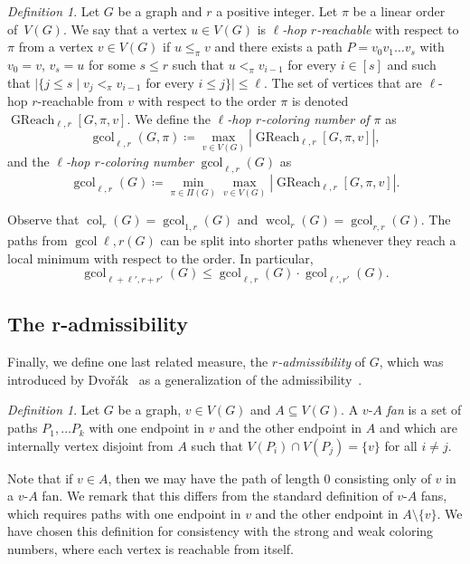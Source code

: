 \documentclass[1p,number,a4paper]{elsarticle}
\theoremstyle{remark}
\DeclareMathOperator{\col}{col}
\DeclareMathOperator{\wcol}{wcol}
\DeclareMathOperator{\gcol}{gcol}
\DeclareMathOperator{\GReach}{GReach}
\newtheorem{definition}[theorem]{Definition}
\begin{document}
\begin{definition}
    Let $G$ be a graph and $r$ a positive integer. Let $\pi$ be a 
    linear order of~$V(G)$. We say that a
    vertex $u\in V(G)$ is \emph{$\ell$-hop $r$-reachable} with respect
    to $\pi$ from a vertex
    $v\in V(G)$ if $u\leq_\pi v$ and there exists a path $P=v_0v_1\ldots v_s$ with $v_0=v$, $v_s=u$ for some $s\leq r$ such that $u<_\pi v_{i-1}$ for every $i\in [s]$ and such that $|\{j\leq s \mid v_j<_\pi v_{i-1}$ for every $i\leq j\}|\leq \ell$. 
    The set of vertices that are $\ell$-hop $r$-reachable from $v$ with 
    respect to the order $\pi$ is denoted $\GReach_{\ell,r}[G,\pi,v]$.
    We define the \emph{$\ell$-hop $r$-coloring number of $\pi$} as
    \[\gcol_{\ell,r}(G,\pi)\coloneqq \max_{v\in V(G)}|\GReach_{\ell,r}[G,\pi,v]|,\]
    and the \emph{$\ell$-hop $r$-coloring number} $\gcol_{\ell,r}(G)$ as
    \[\gcol_{\ell,r}(G)\coloneqq \min_{\pi\in \Pi(G)}\max_{v\in V(G)}|\GReach_{\ell,r}[G,\pi,v]|.\]
    \end{definition}

Observe that $\col_r(G)=\gcol_{1,r}(G)$ and $\wcol_r(G)=\gcol_{r,r}(G)$. The paths from 
$\gcol{\ell,r}(G)$ can be split into shorter paths whenever they reach a local minimum with respect to the order. In particular, 
\[\gcol_{\ell+\ell',r+r'}(G) \leq \gcol_{\ell,r}(G)\cdot \gcol_{\ell',r'}(G).\]

\subsection{The r-admissibility}

Finally, we define one last related measure, the 
\emph{$r$-admissibility}
of $G$, which was introduced by 
Dvo\v{r}\'ak~\cite{dvovrak2013constant} as a 
generalization of the admissibility~\cite{kierstead1994planar}.

\begin{definition}
Let $G$ be a graph, $v\in V(G)$ and $A\subseteq V(G)$. 
A $v$-$A$ \emph{fan} is a 
set of paths $P_1,\ldots P_k$ with one endpoint in $v$ and the
other endpoint in $A$ and which are internally 
vertex disjoint from $A$ 
such that $V(P_i)\cap V(P_j)=\{v\}$
for all $i\neq j$.
\end{definition}

Note that if $v\in A$, then we may have the path of length $0$ consisting only of $v$ in a $v$-$A$ fan. We remark that this differs from the standard definition of $v$-$A$ fans, which requires paths with one endpoint in $v$ and the other endpoint in $A\setminus \{v\}$. We have chosen this definition for consistency with the strong and weak coloring numbers, where each vertex is reachable from itself. 
\end{document}
